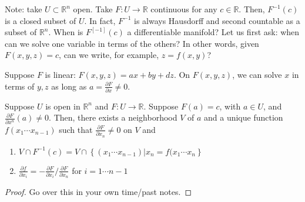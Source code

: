 \documentclass{mathnotes}
\begin{document}
Note: take $U\subset\mathbb{R}^n$ open. Take $F:U\to\mathbb{R}$ continuous for any $c\in\mathbb{R}$. Then, $F^{-1}(c)$ is a closed subset of $U$. In fact, $F^{-1}$ is always
Hausdorff and second countable as a subset of $\mathbb{R}^n$. When is $F^[-1](c)$ a differentiable manifold? Let us first ask: when can we solve one variable
in terms of the others? In other words, given $F(x,y,z)=c$, can we write, for example, $z=f(x,y)$?

\begin{exmp}
    Suppose $F$ is linear: $F(x,y,z)=ax+by+dz$. On $F(x,y,z)$, we can solve $x$ in terms of $y,z$ as long as $a=\frac{\partial F}{\partial x}\neq 0$.
\end{exmp}

\begin{thm}
    Suppose $U$ is open in $\mathbb{R}^n$ and $F:U\to\mathbb{R}$. Suppose $F(a)=c$, with $a\in U$, and $\frac{\partial F}{\partial x^n}(a)\neq 0$.
    Then, there exists a neighborhood $V$ of $a$ and a unique function $f(x_1\cdots x_{n-1})$ such that $\frac{\partial F}{\partial x_n}\neq0$ on $V$ and
    \begin{enumerate}
        \item $V\cap F^{-1}(c)=V\cap\left\{ (x_1\cdots x_{n-1}) | x_n=f(x_1\cdots x_{n} \right\}$
        \item $\frac{\partial f}{\partial x_i}=-\frac{\partial F}{\partial x_i}/\frac{\partial F}{\partial x_n}$ for $i=1\cdots n-1$
    \end{enumerate}
\end{thm}
\begin{proof}
    Go over this in your own time/past notes.
\end{proof}
\end{document}
